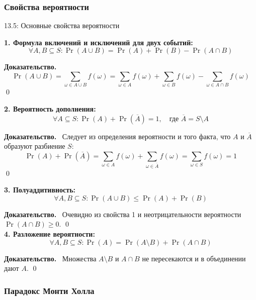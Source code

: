 \documentclass[a4paper,12pt]{article}
\newcommand{\myproof}{\textbf{Доказательство.}\ }
\begin{document}
	\subsubsection{Свойства вероятности}
	
	\begin{propertybox}{13.5: Основные свойства вероятности}
		
		\textbf{1. Формула включений и исключений для двух событий:}
		\[ \forall A, B \subseteq S: \Pr(A \cup B) = \Pr(A) + \Pr(B) - \Pr(A \cap B) \]
		
		\myproof
		\[ \Pr(A \cup B) = \sum_{\omega \in A \cup B} f(\omega) = \sum_{\omega \in A} f(\omega) + \sum_{\omega \in B} f(\omega) - \sum_{\omega \in A \cap B} f(\omega) \]
		\qed
		
		\textbf{2. Вероятность дополнения:}
		\[ \forall A \subseteq S: \Pr(A) + \Pr(\overline{A}) = 1, \quad \text{где } \overline{A} = S \setminus A \]
		
		\myproof
		Следует из определения вероятности и того факта, что \(A\) и \(\overline{A}\) образуют разбиение \(S\):
		\[ \Pr(A) + \Pr(\overline{A}) = \sum_{\omega \in A} f(\omega) + \sum_{\omega \in \overline{A}} f(\omega) = \sum_{\omega \in S} f(\omega) = 1 \]
		\qed
		
		\textbf{3. Полуаддитивность:}
		\[ \forall A, B \subseteq S: \Pr(A \cup B) \le \Pr(A) + \Pr(B) \]
		
		\myproof
		Очевидно из свойства 1 и неотрицательности вероятности \(\Pr(A \cap B) \ge 0\). \qed \\
		
		\textbf{4. Разложение вероятности:}
		\[ \forall A, B \subseteq S: \Pr(A) = \Pr(A \setminus B) + \Pr(A \cap B) \]
		
		\myproof
		Множества \(A \setminus B\) и \(A \cap B\) не пересекаются и в объединении дают \(A\). \qed
	\end{propertybox}
	
	
	\subsubsection{Парадокс Монти Холла}
	
\end{document}
